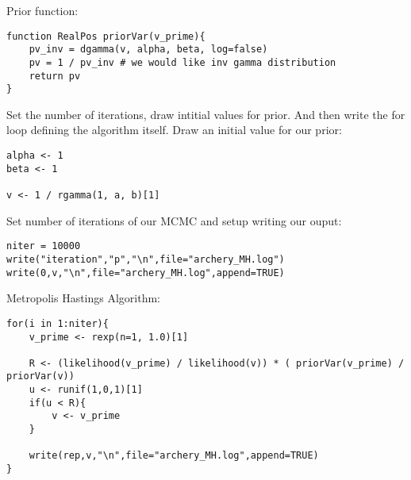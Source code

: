 Prior function: 

{\tt \begin{snugshade*}
 \begin{lstlisting}
function RealPos priorVar(v_prime){
	pv_inv = dgamma(v, alpha, beta, log=false)
	pv = 1 / pv_inv # we would like inv gamma distribution
	return pv
}
\end{lstlisting}
\end{snugshade*}}



Set the number of iterations, draw intitial values for prior. And then write the for loop defining the algorithm itself. 
Draw an initial value for our prior:

{\tt \begin{snugshade*}
 \begin{lstlisting}
alpha <- 1
beta <- 1

v <- 1 / rgamma(1, a, b)[1]
\end{lstlisting}
\end{snugshade*}}

Set number of iterations of our MCMC and setup writing our ouput:

{\tt \begin{snugshade*}
 \begin{lstlisting}
niter = 10000
write("iteration","p","\n",file="archery_MH.log")
write(0,v,"\n",file="archery_MH.log",append=TRUE)
\end{lstlisting}
\end{snugshade*}}


Metropolis Hastings Algorithm:

{\tt \begin{snugshade*}
 \begin{lstlisting}
for(i in 1:niter){
	v_prime <- rexp(n=1, 1.0)[1]
    
	R <- (likelihood(v_prime) / likelihood(v)) * ( priorVar(v_prime) / priorVar(v))
	u <- runif(1,0,1)[1]
	if(u < R){
		v <- v_prime
	}

	write(rep,v,"\n",file="archery_MH.log",append=TRUE)
}
\end{lstlisting}
\end{snugshade*}}




